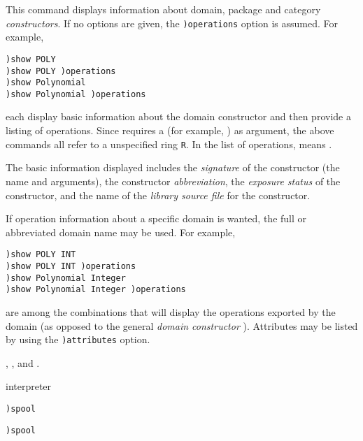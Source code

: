 {{{{{{{\par{}
This command displays information about \Language{}
domain, package and category {\it constructors}.
If no options are given, the {\tt )operations} option is assumed.
For example,
\begin{verbatim}
)show POLY
)show POLY )operations
)show Polynomial
)show Polynomial )operations
\end{verbatim}
each display basic information about the
 domain constructor and then provide a
listing of operations.
Since  requires a  (for example,
) as argument, the above commands all refer
to a unspecified ring {\tt R}.
In the list of operations, \spadSyntax{$} means
.

The basic information displayed includes the {\it signature}
of the constructor (the name and arguments), the constructor
{\it abbreviation}, the {\it exposure status} of the constructor, and the
name of the {\it library source file} for the constructor.

If operation information about a specific domain is wanted,
the full or abbreviated domain name may be used.
For example,
\begin{verbatim}
)show POLY INT
)show POLY INT )operations
)show Polynomial Integer
)show Polynomial Integer )operations
\end{verbatim}
are among  the combinations that will
display the operations exported  by the
domain  (as opposed to the general
{\it domain constructor} ).
Attributes may be listed by using the {\tt )attributes} option.

\par{}
,
, and
.




\par{} interpreter

\par{}
\begin{simpleList}
\item{\tt )spool} \ranb{}
\item{\tt )spool}
\end{simpleList}

}}}}}}}
